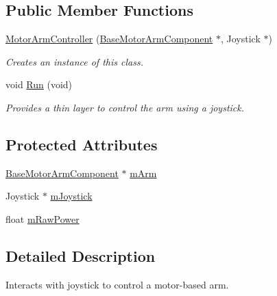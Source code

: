\subsection*{\-Public \-Member \-Functions}
\begin{DoxyCompactItemize}
\item 
\hyperlink{class_motor_arm_controller_ab5419aad4122c6f033675ae4fe954232}{\-Motor\-Arm\-Controller} (\hyperlink{class_base_motor_arm_component}{\-Base\-Motor\-Arm\-Component} $\ast$, \-Joystick $\ast$)
\begin{DoxyCompactList}\small\item\em \-Creates an instance of this class. \end{DoxyCompactList}\item 
void \hyperlink{class_motor_arm_controller_a81b86f366a87226dbb9cc22f501a5224}{\-Run} (void)
\begin{DoxyCompactList}\small\item\em \-Provides a thin layer to control the arm using a joystick. \end{DoxyCompactList}\end{DoxyCompactItemize}
\subsection*{\-Protected \-Attributes}
\begin{DoxyCompactItemize}
\item 
\hyperlink{class_base_motor_arm_component}{\-Base\-Motor\-Arm\-Component} $\ast$ \hyperlink{class_motor_arm_controller_a149d1988cb596750890076784342e351}{m\-Arm}
\item 
\-Joystick $\ast$ \hyperlink{class_motor_arm_controller_a6a5b5137268f126d0d71cd1d39d2542e}{m\-Joystick}
\item 
float \hyperlink{class_motor_arm_controller_a93a818b75f8b0a7c94bcfbfe1a7130f5}{m\-Raw\-Power}
\end{DoxyCompactItemize}


\subsection{\-Detailed \-Description}
\-Interacts with joystick to control a motor-\/based arm. 

